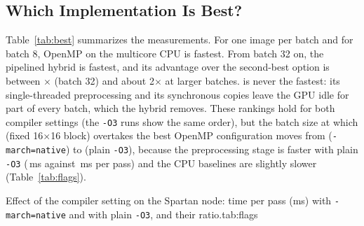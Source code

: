 \subsection{Which Implementation Is Best?}
Table~\ref{tab:best} summarizes the measurements. For one image per batch and for batch 8, OpenMP on the multicore CPU is fastest. From batch 32 on, the pipelined hybrid is fastest, and its advantage over the second-best option is between $\times$ (batch 32) and about 2$\times$ at larger batches. \cudabase{} is never the fastest: its single-threaded preprocessing and its synchronous copies leave the GPU idle for part of every batch, which the hybrid removes. These rankings hold for both compiler settings (the \texttt{-O3} runs show the same order), but the batch size at which \cudabase{} (fixed 16$\times$16 block) overtakes the best OpenMP configuration moves from  (\texttt{-march=native}) to  (plain \texttt{-O3}), because the preprocessing stage is faster with plain \texttt{-O3} (\,ms against \,ms per pass) and the CPU baselines are slightly slower (Table~\ref{tab:flags}).

\begin{coltable}{Effect of the compiler setting on the Spartan node: time per pass (ms) with \texttt{-march=native} and with plain \texttt{-O3}, and their ratio.}{tab:flags}
\fitcol{}
\end{coltable}
